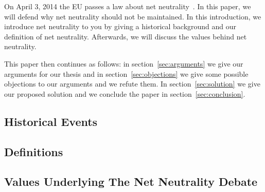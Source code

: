 
On April 3, 2014 the EU passes a law about net neutrality~\cite{whittaker2014eu}. In this paper, we will defend why net neutrality should not be maintained. In this introduction, we introduce net neutrality to you by giving a historical background and our definition of net neutrality. Afterwards, we will discuss the values behind net neutrality.

This paper then continues as follows: in section~\ref{sec:arguments} we give our arguments for our thesis and in section~\ref{sec:objections} we give some possible objections to our arguments and we refute them. In section~\ref{sec:solution} we give our proposed solution and we conclude the paper in section~\ref{sec:conclusion}.

\subsection{Historical Events}
\label{sec:intro_problem}


\subsection{Definitions}
\label{sec:intro_def}


\subsection{Values Underlying The Net Neutrality Debate}
\label{sec:intro_values}
